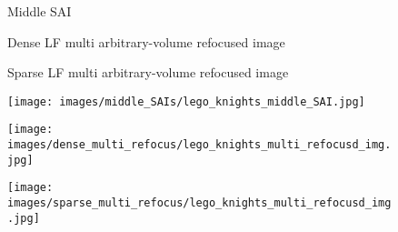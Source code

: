 \begin{figure*}[!p]
    \centering
    
    \begin{subfigure}[c]{0.29\textwidth}
         \centering
         \caption*{Middle SAI}
     \end{subfigure}
     \hspace{0.1cm}
    \begin{subfigure}[c]{0.29\textwidth}
         \centering
         \caption*{\centering Dense LF multi arbitrary-volume refocused image}
     \end{subfigure}
     \hspace{0.1cm}
     \begin{subfigure}[c]{0.29\textwidth}
         \centering
         \caption*{\centering Sparse LF multi arbitrary-volume refocused image}
     \end{subfigure}

    \begin{subfigure}[t]{0.29\textwidth}
         \centering
         \texttt{[image: images/middle\_SAIs/lego\_knights\_middle\_SAI.jpg]}
     \end{subfigure}
     \hspace{0.1cm}
    \begin{subfigure}[t]{0.29\textwidth}
         \centering
         \texttt{[image: images/dense\_multi\_refocus/lego\_knights\_multi\_refocusd\_img.jpg]}
         \caption{}
     \end{subfigure}
     \hspace{0.1cm}
     \begin{subfigure}[t]{0.29\textwidth}
         \centering
         \texttt{[image: images/sparse\_multi\_refocus/lego\_knights\_multi\_refocusd\_img.jpg]}
     \end{subfigure}
     
    \vspace{0.2cm}

     

\end{figure*}
